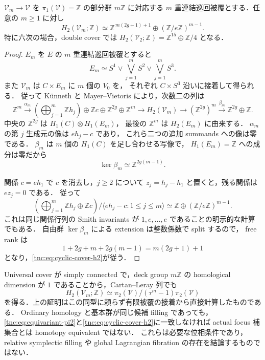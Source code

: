 \begin{theorem}[有限巡回被覆の第二整数ホモロジー]
\label{tnc:cyclic-cover-h2}
$\mathcal V_m\to\mathcal V$ を
$\pi_1(\mathcal V)=\mathbb Z$ の部分群 $m\mathbb Z$ に対応する
$m$ 重連結巡回被覆とする．任意の $m\ge1$ に対し
\begin{equation}\label{tnc:eq:cyclic-cover-h2}
 H_2(\mathcal V_m;\mathbb Z)
 \simeq
 \mathbb Z^{\,m(2g+1)+1}\oplus(\mathbb Z/e\mathbb Z)^{m-1}.
\end{equation}
特に六次の場合，double cover では
$H_2(\mathcal V_2;\mathbb Z)=\mathbb Z^{15}\oplus\mathbb Z/4$ となる．
\end{theorem}
\begin{proof}
$E_m$ を $E$ の $m$ 重連結巡回被覆とすると
\[
 E_m\simeq S^1\vee\bigvee_{j=1}^mS^2\vee\bigvee_{j=1}^mS^3.
\]
また $\mathcal V_m$ は $C\times E_m$ に $m$ 個の $V_0$ を，
それぞれ $C\times S^3$ 沿いに接着して得られる．
従って K\"unneth と Mayer--Vietoris により，次数二の列は
\[
 \mathbb Z^m\xrightarrow{\alpha_m}
 \left(\bigoplus_{j=1}^m\mathbb Z h_j\right)
 \oplus\mathbb Z c\oplus\mathbb Z^{2g}\oplus\mathbb Z^m
 \longrightarrow H_2(\mathcal V_m)
 \longrightarrow(\mathbb Z^{2g})^m
 \xrightarrow{\beta_m}\mathbb Z^{2g}\oplus\mathbb Z.
\]
中央の $\mathbb Z^{2g}$ は $H_1(C)\otimes H_1(E_m)$，
最後の $\mathbb Z^m$ は $H_2(E_m)$ に由来する．
$\alpha_m$ の第 $j$ 生成元の像は $e h_j-c$ であり，
これら二つの追加 summands への像は零である．
$\beta_m$ は $m$ 個の $H_1(C)$ を足し合わせる写像で，
$H_1(E_m)=\mathbb Z$ への成分は零だから
\[
 \ker\beta_m\simeq\mathbb Z^{2g(m-1)}.
\]

関係 $c=e h_1$ で $c$ を消去し，$j\ge2$ について
$z_j=h_j-h_1$ と置くと，残る関係は $e z_j=0$ である．
従って
\[
 \left(\bigoplus_{j=1}^m\mathbb Z h_j\oplus\mathbb Z c\right)
   /\langle e h_j-c:1\le j\le m\rangle
 \simeq\mathbb Z\oplus(\mathbb Z/e\mathbb Z)^{m-1}.
\]
これは同じ関係行列の Smith invariants が
$1,e,\ldots,e$ であることの明示的な計算でもある．
自由群 $\ker\beta_m$ による extension は整数係数で split するので，
free rank は
\[
 1+2g+m+2g(m-1)=m(2g+1)+1
\]
となり，\eqref{tnc:eq:cyclic-cover-h2}が従う．
\end{proof}

\begin{remark}
Universal cover が simply connected で，deck group $m\mathbb Z$ の
homological dimension が $1$ であることから，Cartan--Leray 列でも
\[
 H_2(\mathcal V_m;\mathbb Z)
 \simeq \pi_2(\mathcal V)/(\tau^m-1)\pi_2(\mathcal V)
\]
を得る．上の証明はこの同型に頼らず有限被覆の接着から直接計算したものである．
Ordinary homology と基本群が同じ候補 filling であっても，
\eqref{tnc:eq:equivariant-pi2}と\eqref{tnc:eq:cyclic-cover-h2}に一致しなければ
actual focus 補集合とは homotopy equivalent ではない．
これらは必要な位相条件であり，relative symplectic filling や
global Lagrangian fibration の存在を結論するものではない．
\end{remark}
